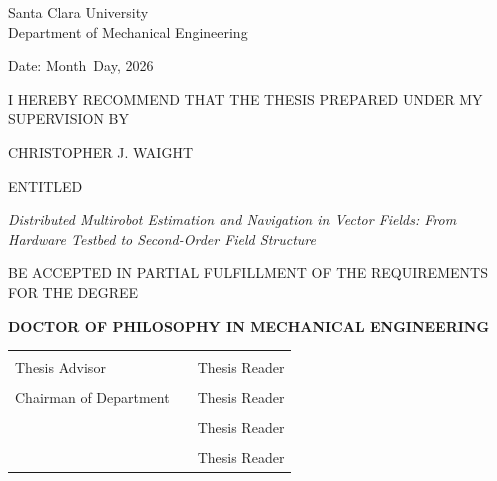 \documentclass[12pt, letterpaper, oneside]{report}
\newcommand{\thesistitle}{Distributed Multirobot Estimation and Navigation in Vector Fields: From Hardware Testbed to Second-Order Field Structure}
\newcommand{\thesisauthor}{Christopher J. Waight}
\newcommand{\thesisdepartment}{Mechanical Engineering}
\newcommand{\thesisdegreefield}{Mechanical Engineering}
\newcommand{\thesisyear}{2026}
\newcommand{\thesismonth}{Month}
\newcommand{\thesisday}{Day}
\begin{document}
\setcounter{page}{1}

\begin{titlepage}
\begin{center}
  \large
  Santa Clara University \\[6pt]
  Department of \thesisdepartment

  \vspace{1.5in}

  \normalsize
  Date: \thesismonth\ \thesisday, \thesisyear

  \vspace{1in}

  I HEREBY RECOMMEND THAT THE THESIS PREPARED UNDER MY SUPERVISION BY

  \vspace{0.5in}
  \MakeUppercase{\thesisauthor}
  \vspace{0.5in}

  ENTITLED

  \vspace{0.4in}
  \textit{\thesistitle}
  \vspace{0.4in}

  BE ACCEPTED IN PARTIAL FULFILLMENT OF THE REQUIREMENTS FOR THE DEGREE

  \vspace{0.3in}
  \textbf{DOCTOR OF PHILOSOPHY IN \MakeUppercase{\thesisdegreefield}}
\end{center}

\vspace{0.8in}

\noindent
\begin{tabular}{p{3in} p{0.3in} p{3in}}
  \hrulefill & & \hrulefill \\[2pt]
  Thesis Advisor & & Thesis Reader \\[24pt]
  \hrulefill & & \hrulefill \\[2pt]
  Chairman of Department & & Thesis Reader \\[24pt]
  & & \hrulefill \\[2pt]
  & & Thesis Reader \\[24pt]
  & & \hrulefill \\[2pt]
  & & Thesis Reader
\end{tabular}

\end{titlepage}
\end{document}
